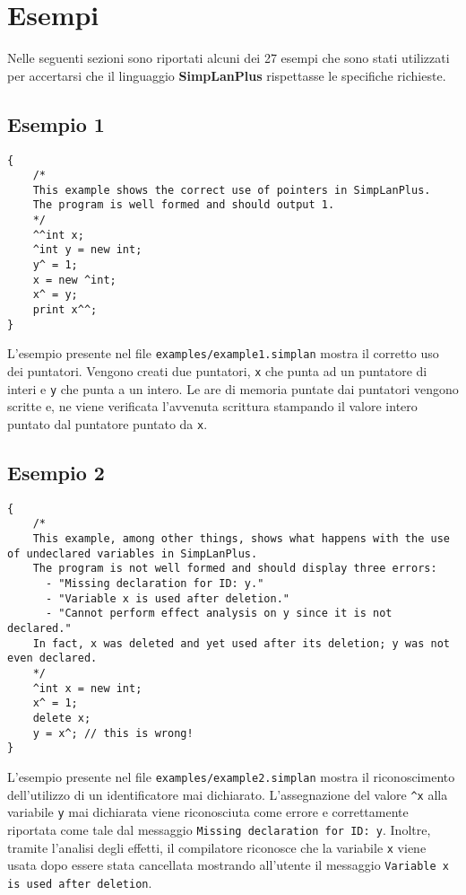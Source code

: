 \documentclass[../report.tex]{subfiles}
\begin{document}
\chapter{Esempi}\label{c:esempi}
Nelle seguenti sezioni sono riportati alcuni dei 27 esempi che sono stati utilizzati per accertarsi che il linguaggio \textbf{SimpLanPlus} rispettasse le specifiche richieste.
\section{Esempio 1}
\begin{lstlisting}
{
    /*
    This example shows the correct use of pointers in SimpLanPlus.
    The program is well formed and should output 1.
    */
    ^^int x;
    ^int y = new int;
    y^ = 1;
    x = new ^int;
    x^ = y;
    print x^^;
}
\end{lstlisting}
L'esempio presente nel file \verb|examples/example1.simplan| mostra il corretto uso dei puntatori. Vengono creati due puntatori, \verb|x| che punta ad un puntatore di interi e \verb|y| che punta a un intero. Le are di memoria puntate dai puntatori vengono scritte e, ne viene verificata l'avvenuta scrittura stampando il valore intero puntato dal puntatore puntato da \verb|x|.

\section{Esempio 2}
\begin{lstlisting}
{
    /*
    This example, among other things, shows what happens with the use of undeclared variables in SimpLanPlus.
    The program is not well formed and should display three errors:
      - "Missing declaration for ID: y."
      - "Variable x is used after deletion."
      - "Cannot perform effect analysis on y since it is not declared."
    In fact, x was deleted and yet used after its deletion; y was not even declared.
    */
    ^int x = new int;
    x^ = 1;
    delete x;
    y = x^; // this is wrong!
}
\end{lstlisting}
L'esempio presente nel file \verb|examples/example2.simplan| mostra il riconoscimento dell'utilizzo di un identificatore mai dichiarato. L'assegnazione del valore \verb|^x| alla variabile \verb|y| mai dichiarata viene riconosciuta come errore e correttamente riportata come tale dal messaggio \verb|Missing declaration for ID: y|. Inoltre, tramite l'analisi degli effetti, il compilatore riconosce che la variabile \verb|x| viene usata dopo essere stata cancellata mostrando all'utente il messaggio \verb|Variable x is used after deletion|.
\end{document}
